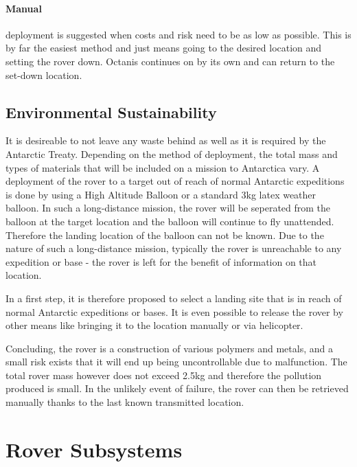 \documentclass[a4paper,12pt]{article}
\begin{document}
\paragraph{Manual} deployment is suggested when costs and risk need to be as low as possible. This is by far the easiest method and just means going to the desired location and setting the rover down. Octanis continues on by its own and can return to the set-down location.




\subsection{Environmental Sustainability}
It is desireable to not leave any waste behind as well as it is required by the Antarctic Treaty. Depending on the method of deployment, the total mass and types of materials that will be included on a mission to Antarctica vary. A deployment of the rover to a target out of reach of normal Antarctic expeditions is done by using a High Altitude Balloon or a standard 3kg latex weather balloon. In such a long-distance mission, the rover will be seperated from the balloon at the target location and the balloon will continue to fly unattended. Therefore the landing location of the balloon can not be known. Due to the nature of such a long-distance mission, typically the rover is unreachable to any expedition or base - the rover is left for the benefit of information on that location.

In a first step, it is therefore proposed to select a landing site that is in reach of normal Antarctic expeditions or bases. It is even possible to release the rover by other means like bringing it to the location manually or via helicopter.

Concluding, the rover is a construction of various polymers and metals, and a small risk exists that it will end up being uncontrollable due to malfunction. The total rover mass however does not exceed 2.5kg and therefore the pollution produced is small. In the unlikely event of failure, the rover can then be retrieved manually thanks to the last known transmitted location.




\section{Rover Subsystems}
\end{document}
